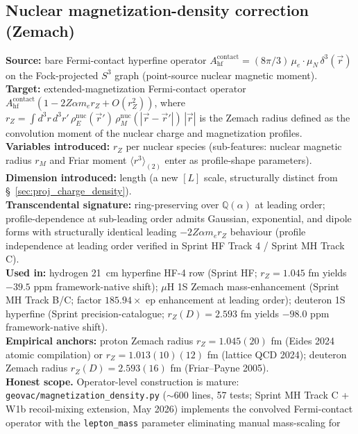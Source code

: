 \documentclass[11pt]{article}
\begin{document}
\subsection{Nuclear magnetization-density correction (Zemach)}
\label{sec:proj_magnetization_density}
\textbf{Source:} bare Fermi-contact hyperfine operator
$A_\text{hf}^\text{contact} = (8\pi/3)\,\mu_e \cdot \mu_N\,\delta^3(\vec{r})$
on the Fock-projected $S^3$ graph (point-source nuclear magnetic
moment).\\
\textbf{Target:} extended-magnetization Fermi-contact operator
$A_\text{hf}^\text{contact}(1 - 2 Z\alpha m_e r_Z + O(r_Z^2))$,
where $r_Z = \int d^3r\, d^3r'\,\rho_E^\text{nuc}(\vec{r}')\,
\rho_M^\text{nuc}(|\vec{r}-\vec{r}'|)\,|\vec{r}|$ is the Zemach
radius defined as the convolution moment of the nuclear charge and
magnetization profiles.\\
\textbf{Variables introduced:} $r_Z$ per nuclear species
(sub-features: nuclear magnetic radius $r_M$ and Friar moment
$\langle r^3\rangle_{(2)}$ enter as profile-shape parameters).\\
\textbf{Dimension introduced:} length (a new $[L]$ scale,
structurally distinct from \S~\ref{sec:proj_charge_density}).\\
\textbf{Transcendental signature:} ring-preserving over
$\mathbb{Q}(\alpha)$ at leading order; profile-dependence at
sub-leading order admits Gaussian, exponential, and dipole forms
with structurally identical leading $-2 Z\alpha m_e r_Z$ behaviour
(profile independence at leading order verified in Sprint HF
Track 4 / Sprint MH Track C).\\
\textbf{Used in:} hydrogen 21~cm hyperfine HF-4 row (Sprint HF;
$r_Z = 1.045$ fm yields $-39.5$ ppm framework-native shift); $\mu$H
1S Zemach mass-enhancement (Sprint MH Track B/C; factor $185.94
\times$ ep enhancement at leading order); deuteron 1S hyperfine
(Sprint precision-catalogue; $r_Z(D) = 2.593$ fm yields $-98.0$ ppm
framework-native shift).\\
\textbf{Empirical anchors:} proton Zemach radius
$r_Z = 1.045(20)$ fm (Eides 2024 atomic compilation) or $r_Z =
1.013(10)(12)$ fm (lattice QCD 2024); deuteron Zemach radius
$r_Z(D) = 2.593(16)$ fm (Friar--Payne 2005).\\
\textbf{Honest scope.}  Operator-level construction is mature:
\texttt{geovac/magnetization\_density.py} ($\sim 600$ lines, 57
tests; Sprint MH Track C + W1b recoil-mixing extension, May 2026)
implements the convolved Fermi-contact operator with the
\texttt{lepton\_mass} parameter eliminating manual mass-scaling for
\end{document}
